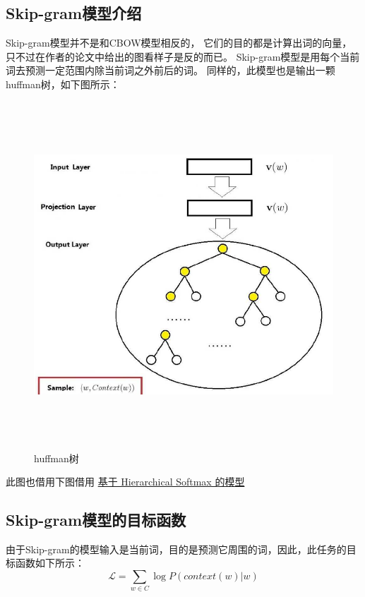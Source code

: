     \subsection{Skip-gram模型介绍}
    Skip-gram模型并不是和CBOW模型相反的，
    它们的目的都是计算出词的向量，只不过在作者的论文中给出的图看样子是反的而已。
    Skip-gram模型是用每个当前词去预测一定范围内除当前词之外前后的词。
    同样的，此模型也是输出一颗huffman树，如下图所示：
    \begin{figure}[h]
        \begin{center}
            \includegraphics[width=12cm,height=13cm]{3_1}
            \caption{huffman树}
        \end{center}
    \end{figure}
    此图也借用下图借用 
    \href{http://blog.csdn.net/itplus/article/details/37969979}{基于 Hierarchical Softmax 的模型}

    \subsection{Skip-gram模型的目标函数}
    由于Skip-gram的模型输入是当前词，目的是预测它周围的词，因此，此任务的目标函数如下所示：
    \begin{equation}
        \mathcal{L} = \sum_{w \in C} \log P(context(w)|w)
    \end{equation}

